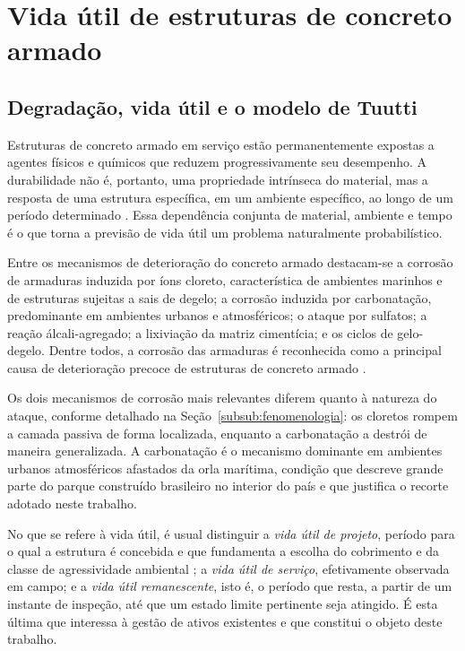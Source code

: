 \section{Vida \'util de estruturas de concreto armado}\label{sec:vida_util}


\subsection{Degrada\c{c}\~ao, vida \'util e o modelo de Tuutti}
\label{subsec:degradacao}

Estruturas de concreto armado em serviço estão permanentemente expostas a agentes físicos e químicos que reduzem progressivamente seu desempenho. A durabilidade não é, portanto, uma propriedade intrínseca do material, mas a resposta de uma estrutura específica, em um ambiente específico, ao longo de um período determinado \parencite{fib2006}. Essa dependência conjunta de material, ambiente e tempo é o que torna a previsão de vida útil um problema naturalmente probabilístico.

Entre os mecanismos de deterioração do concreto armado destacam-se a corrosão de armaduras induzida por íons cloreto, característica de ambientes marinhos e de estruturas sujeitas a sais de degelo; a corrosão induzida por carbonatação, predominante em ambientes urbanos e atmosféricos; o ataque por sulfatos; a reação álcali-agregado; a lixiviação da matriz cimentícia; e os ciclos de gelo-degelo. Dentre todos, a corrosão das armaduras é reconhecida como a principal causa de deterioração precoce de estruturas de concreto armado \parencite{tuutti1982, melchers2018}.

Os dois mecanismos de corrosão mais relevantes diferem quanto à natureza do ataque, conforme detalhado na Seção~\ref{subsub:fenomenologia}: os cloretos rompem a camada passiva de forma localizada, enquanto a carbonatação a destrói de maneira generalizada. A carbonatação é o mecanismo dominante em ambientes urbanos atmosféricos afastados da orla marítima, condição que descreve grande parte do parque construído brasileiro no interior do país e que justifica o recorte adotado neste trabalho.

No que se refere à vida útil, é usual distinguir a \textit{vida útil de projeto}, período para o qual a estrutura é concebida e que fundamenta a escolha do cobrimento e da classe de agressividade ambiental \parencite{nbr6118}; a \textit{vida útil de serviço}, efetivamente observada em campo; e a \textit{vida útil remanescente}, isto é, o período que resta, a partir de um instante de inspeção, até que um estado limite pertinente seja atingido. É esta última que interessa à gestão de ativos existentes e que constitui o objeto deste trabalho.

